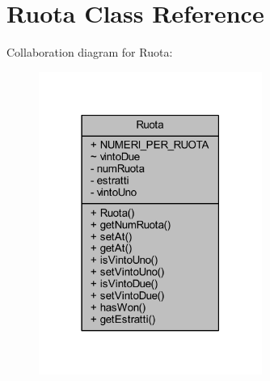 \hypertarget{classmain_1_1_ruota}{}\section{Ruota Class Reference}
\label{classmain_1_1_ruota}


Collaboration diagram for Ruota\+:
\nopagebreak
\begin{figure}[H]
\begin{center}
\leavevmode
\includegraphics[width=207pt]{classmain_1_1_ruota__coll__graph}
\end{center}
\end{figure}
